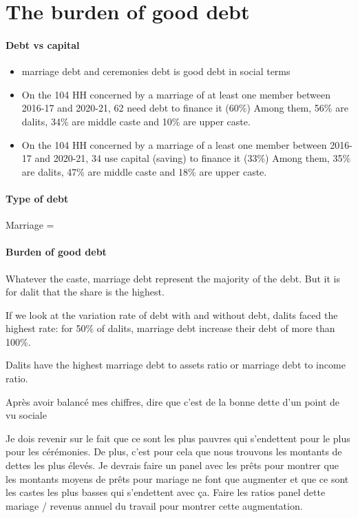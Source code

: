 \documentclass[a4paper, 11pt, onecolumn]{article}
\begin{document}
\section{The burden of good debt}

\paragraph{Debt vs capital}
\begin{itemize}
\item \cite{DeNeve2016, Guerin2014a} marriage debt and ceremonies debt is good debt in social terms
\item On the 104 HH concerned by a marriage of at least one member between 2016-17 and 2020-21, 62 need debt to finance it (60\%)
Among them, 56\% are dalits, 34\% are middle caste and 10\% are upper caste.
\item On the 104 HH concerned by a marriage of a least one member between 2016-17 and 2020-21, 34 use capital (saving) to finance it (33\%)
Among them, 35\% are dalits, 47\% are middle caste and 18\% are upper caste.
\end{itemize}

\paragraph{Type of debt}
Marriage = 

\paragraph{Burden of good debt}
Whatever the caste, marriage debt represent the majority of the debt.
But it is for dalit that the share is the highest.

If we look at the variation rate of debt with and without debt, dalits faced the highest rate:
for 50\% of dalits, marriage debt increase their debt of more than 100\%.

Dalits have the highest marriage debt to assets ratio or marriage debt to income ratio.






Après avoir balancé mes chiffres, dire que c'est de la bonne dette d'un point de vu sociale

Je dois revenir sur le fait que ce sont les plus pauvres qui s'endettent pour le plus pour les cérémonies. De plus, c'est pour cela que nous trouvons les montants de dettes les plus élevés.
Je devrais faire un panel avec les prêts pour montrer que les montants moyens de prêts pour mariage ne font que augmenter et que ce sont les castes les plus basses qui s'endettent avec ça.
Faire les ratios panel dette mariage / revenus annuel du travail pour montrer cette augmentation.
\end{document}
